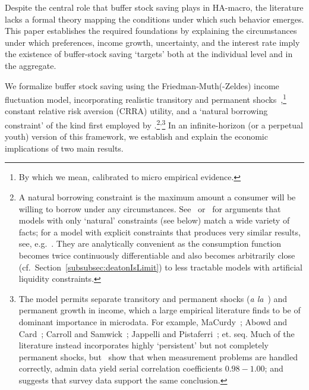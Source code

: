 \documentclass[BufferStockTheory]{subfiles}
\begin{document}
Despite the central role that buffer stock saving plays in HA-macro, the literature lacks a formal theory mapping the conditions under which such behavior emerges.  This paper establishes the required foundations by explaining the circumstances under which preferences, income growth, uncertainty, and the interest rate imply the existence of buffer-stock saving `targets' both at the individual level and in the aggregate.

%

We formalize buffer stock saving using the Friedman-Muth(-Zeldes) income fluctuation model, incorporating realistic transitory and permanent shocks~\citep{friedmanATheory, muthOptimal, zeldesStochastic},\footnote{By which we mean, calibrated to micro empirical evidence.}  constant relative risk aversion (CRRA) utility, and a `natural borrowing constraint' of the kind first employed by \cite{zeldesStochastic}.\footnote{A natural borrowing constraint is the maximum amount a consumer will be willing to borrow under any circumstances. See~\cite{carrollBSLCPIH} or~\cite{gpLifeCycle} for arguments that models with only `natural' constraints (see below) match a wide variety of facts; for a model with explicit constraints that produces very similar results, see, e.g.~\cite{Cagetti}. They are analytically convenient as the consumption function becomes twice continuously differentiable and also becomes arbitrarily close (cf.\ Section~\ref{subsubsec:deatonIsLimit}) to less tractable models with artificial liquidity constraints.}\textsuperscript{,}\footnote{The model permits separate transitory and permanent shocks (\textit{a la}~\cite{muthOptimal}) and permanent growth in income, which a large empirical literature finds to be of dominant importance in microdata. For example, MaCurdy~\citeyearpar{macurdyTimeseries}; Abowd and Card~\citeyearpar{acCovariance}; Carroll and Samwick~\citeyearpar{csNature}; Jappelli and Pistaferri~\citeyear{jpCins}; et. seq.  Much of the literature instead incorporates highly `persistent' but not completely permanent shocks, but~\cite{dhmImproving} show that when measurement problems are handled correctly, admin data yield serial correlation coefficients $0.98-1.00$; and~\cite{dmHowMuch} suggests that survey data support the same conclusion.}  In an infinite-horizon (or a \cite{blanchardFinite} perpetual youth) version of this framework, we establish and explain the economic implications of two main results.
\end{document}
